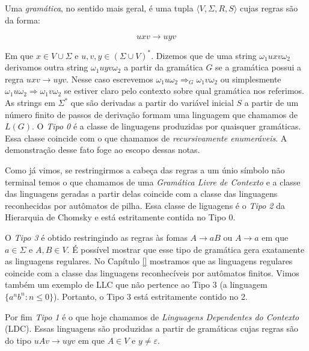 Uma {\em gramática}, no sentido mais geral, é uma tupla $\langle V, \Sigma, R, S\rangle$ cujas regras são da forma:

\begin{displaymath}
  uxv \to uyv 
\end{displaymath}

Em que $x \in V \cup \Sigma$ e $u, v, y \in (\Sigma \cup V)^*$.
Dizemos que de uma string $\omega_1 uxv \omega_2$  derivamos outra string $\omega_1 uyv \omega_2$ a partir da gramática $G$ se a gramática possui a regra $uxv \to uyv$.
Nesse caso escrevemos $\omega_1 u \omega_2 \Rightarrow_G \omega_1 v \omega_2$ ou simplesmente $\omega_1 u \omega_2 \Rightarrow \omega_1 v \omega_2$ se estiver claro pelo contexto sobre qual gramática nos referimos.
As strings em $\Sigma^*$ que são derivadas a partir do variável inicial $S$ a partir de um número finito de passos de derivação formam uma linguagem que chamamos de $L(G)$.
O {\em Tipo 0} é a classe de linguagens produzidas por quaisquer gramáticas.
Essa classe coincide com o que chamamos de {\em recursivamente enumeráveis}.
A demonstração desse fato foge ao escopo dessas notas.

Como já vimos, se restringirmos a cabeça das regras a um únio símbolo não terminal temos o que chamamos de uma {\em Gramática Livre de Contexto} e a classe das linguagens geradas a partir delas coincide com a classe das linguagens reconhecidas por autômatos de pilha.
Essa classe de liguagens é o {\em Tipo 2} da Hierarquia de Chomsky e está estritamente contida no Tipo 0.

O {\em Tipo 3} é obtido restringindo as regras às fomas $A \to aB$ ou $A \to a$ em que $a \in \Sigma$ e $A, B \in V$.
É possível mostrar que esse tipo de gramática gera exatamente as linguagens regulares.
No Capítulo \ref{} mostramos que as linguagens regulares coincide com a classe das linguagens reconhecíveis por autômatos finitos.
Vimos também um exemplo de LLC que não pertence ao Tipo 3 (a linguagem $\{a^nb^n: n \leq 0\}$).
Portanto, o Tipo 3 está estritamente contido no 2.

Por fim {\em Tipo 1} é o que hoje chamamos de {\em Linguagens Dependentes do Contexto} (LDC).
Essas linguagens são produzidas a partir de gramáticas cujas regras são do tipo $uAv \to uyv$ em que $A \in V$ e $y \neq \varepsilon$.


